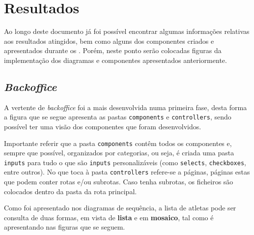 \chapter{Resultados}

Ao longo deste documento já foi possível encontrar algumas informações relativas aos resultados atingidos, bem como alguns dos componentes criados e apresentados durante os . Porém, neste ponto serão colocadas figuras da implementação dos diagramas e componentes apresentados anteriormente.

\section{\textit{Backoffice}}

A vertente de \textit{backoffice} foi a mais desenvolvida numa primeira fase, desta forma a figura que se segue apresenta as pastas \texttt{components} e \texttt{controllers}, sendo possível ter uma visão dos componentes que foram desenvolvidos.

Importante referir que a pasta \texttt{components} contêm todos os componentes e, sempre que possível, organizados por categorias, ou seja, é criada uma pasta \texttt{inputs} para tudo o que são \texttt{inputs} personalizáveis (como \texttt{selects}, \texttt{checkboxes}, entre outros). No que toca à pasta \texttt{controllers} refere-se a páginas, páginas estas que podem conter rotas e/ou subrotas. Caso tenha subrotas, os ficheiros são colocados dentro da pasta da rota principal.

\clearpage

\begin{minipage}[t]{0.45\textwidth}
\end{minipage}
\begin{minipage}[t]{0.45\textwidth}
\end{minipage}

Como foi apresentado nos diagramas de sequência, a lista de atletas pode ser consulta de duas formas, em vista de \textbf{lista} e em \textbf{mosaico}, tal como é apresentando nas figuras que se seguem.

\begin{minipage}[t]{0.45\textwidth}
\end{minipage}
\begin{minipage}[t]{0.45\textwidth}
\end{minipage}

